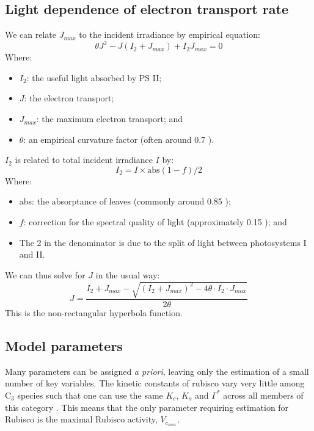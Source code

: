 \documentclass[11pt]{article} %
\begin{document}
\subsection{Light dependence of electron transport rate}
We can relate $J_{max}$ to the incident irradiance by empirical equation:
 \begin{equation} \label{J_J_max_relationship}
 \theta J^2 - J\left (I_2 + J_{max}\right ) + I_2J_{max} = 0
\end{equation}
Where:
\begin{itemize}
 \item $I_2$: the useful light absorbed by PS II;
 \item $J$: the electron transport;
 \item $J_{max}$: the maximum electron transport; and
 \item $\theta$: an empirical curvature factor (often around 0.7 \cite{EvansPhotosynthesisnitrogenrelationships}).
\end{itemize}
$I_2$ is related to total incident irradiance $I$ by:
\begin{equation}
I_2 = I \times \textrm{abs}(1-f)/2
\end{equation}
Where:
\begin{itemize}
 \item abs: the absorptance of leaves (commonly around 0.85 \cite{CaemmererBiochemicalmodelsleaf2000});
 \item $f$: correction for the spectral quality of light (approximately 0.15 \cite{EvansDependenceQuantumYield1987}); and
 \item The 2 in the denominator is due to the split of light between photosystems I and II.
\end{itemize}
We can thus solve for $J$ in the usual way:
\begin{equation} \label{nonrectangular_hyperbola}
J = \frac{I_2 + J_{max} - \sqrt{\left ( I_2 + J_{max}\right )^2 - 4\theta \cdot I_2 \cdot J_{max}}}{2 \theta}
\end{equation}
This is the non-rectangular hyperbola function.

\subsection{Model parameters}
Many parameters can be assigned \emph{a priori}, leaving only the estimation of a small number of key variables. The kinetic constants of rubisco vary very little among C$_3$ species such that one can use the same $K_c$, $K_o$ and $\Gamma^*$ across all members of this category \cite{CaemmererBiochemicalmodelsleaf2000}. This means that the only parameter requiring estimation for Rubisco is the maximal Rubisco activity, $V_{c_{max}}$. 
\end{document}
